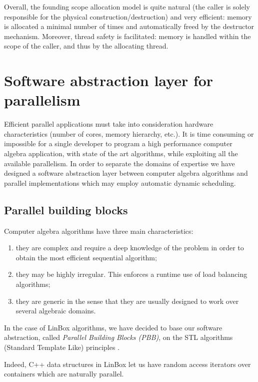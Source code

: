 \documentclass{article}
\newcommand{\linbox}{{\sc LinBox}\xspace}
\begin{document}


Overall, the founding scope allocation model is quite natural (the caller is
solely responsible for the physical construction/destruction) and very
efficient: memory is allocated a minimal number of times and
automatically freed by the destructor mechanism. Moreover, thread
safety is facilitated: memory is handled within the scope of the
caller, and thus by the allocating thread. %

\section{Software abstraction layer for parallelism}\label{sec:pbb}

Efficient parallel applications must take into consideration hardware
characteristics (number of cores, memory hierarchy, etc.). It is time
consuming or impossible for a single developer to 
program a high performance computer algebra application, with state of
the art algorithms, while exploiting all the available parallelism.  
In order to separate the domains of expertise we have designed a
software abstraction layer between computer algebra algorithms
and parallel implementations which may employ automatic dynamic scheduling.

\subsection{Parallel building blocks}\label{ssec:parallel}
Computer algebra algorithms have three main characteristics:
\begin{enumerate}
\item
they are complex and require a deep knowledge of the problem in
  order to obtain the most efficient sequential algorithm;
\item
they may be highly irregular. This enforces a runtime use of
  load balancing algorithms;
\item
they are generic in the sense that they are usually designed
  to work over several algebraic domains.
\end{enumerate}

  In the case of \linbox algorithms, we have decided to base our
  software abstraction, called {\em Parallel Building Blocks (PBB)},
  on the STL algorithms (Standard Template Like) principles
  \cite{Musser:1996:STL}.

  Indeed, C++ data structures in \linbox let us have random access
  iterators over containers which are naturally parallel. 
 
\end{document}
